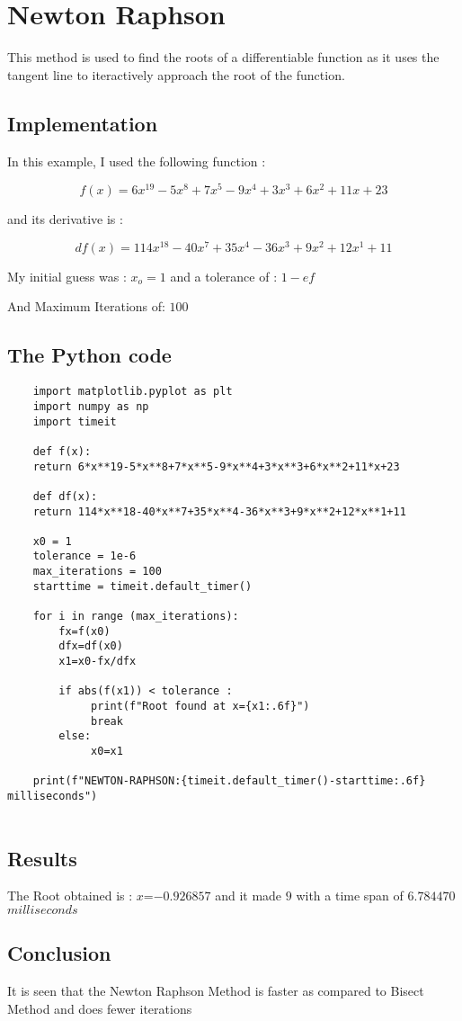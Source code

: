 \documentclass{article}
\begin{document}
\section{Newton Raphson}
This method is used to find the roots of a differentiable function as it uses the tangent line to iteractively approach the root of the function.

\subsection*{Implementation}
In this example, I used the following function :


\begin{equation}
    f(x)= 6x^{19}-5x^8+7x^5-9x^4+3x^3+6x^2+11x+23
\end{equation}

and its derivative is : 

\begin{equation}
    df(x) = 114x^{18}-40x^7+35x^4-36x^3+9x^2+12x^1+11
\end{equation}

My initial guess was : ${x_o = 1}$ and  a tolerance of : ${1-ef}$ 

And Maximum Iterations of: ${100}$




\subsection* {The Python code} \lstset{language=Python}
\begin{verbatim}
    import matplotlib.pyplot as plt
    import numpy as np
    import timeit 
    
    def f(x):
    return 6*x**19-5*x**8+7*x**5-9*x**4+3*x**3+6*x**2+11*x+23

    def df(x):
    return 114*x**18-40*x**7+35*x**4-36*x**3+9*x**2+12*x**1+11

    x0 = 1
    tolerance = 1e-6
    max_iterations = 100
    starttime = timeit.default_timer()

    for i in range (max_iterations):
        fx=f(x0)
        dfx=df(x0)
        x1=x0-fx/dfx

        if abs(f(x1)) < tolerance :
             print(f"Root found at x={x1:.6f}")
             break
        else:
             x0=x1

    print(f"NEWTON-RAPHSON:{timeit.default_timer()-starttime:.6f} milliseconds")
    
        \end{verbatim}

\subsection*{Results}
   The Root obtained is : ${x}$=${-0.926857}$ and it made ${9}$ with a time span of ${  6.784470 }$ ${ milliseconds}$
   \subsection*{Conclusion}
   It is seen that the Newton Raphson Method is faster as compared to Bisect Method and does fewer iterations 
  
\end{document}
